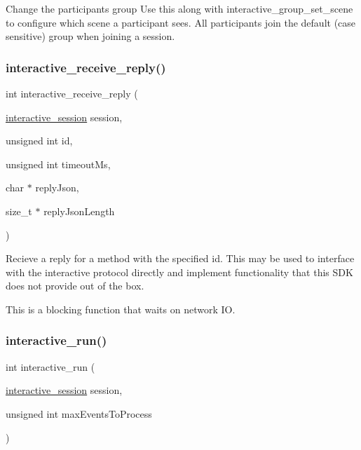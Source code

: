 Change the participant\textquotesingle{}s group Use this along with {\ttfamily interactive\+\_\+group\+\_\+set\+\_\+scene} to configure which scene a participant sees. All participants join the \textquotesingle{}default\textquotesingle{} (case sensitive) group when joining a session. 

\mbox{\label{group___interactivity_ga7e441089be6e25051bcc4d4249bb1379}} 
\subsubsection{\texorpdfstring{interactive\+\_\+receive\+\_\+reply()}{interactive\_receive\_reply()}}
{\footnotesize\ttfamily int interactive\+\_\+receive\+\_\+reply (\begin{DoxyParamCaption}\item[{\mbox{\hyperlink{group___interactivity_ga6d8819d38b8dc8994a2299cf22a65a31}{interactive\+\_\+session}}}]{session,  }\item[{unsigned int}]{id,  }\item[{unsigned int}]{timeout\+Ms,  }\item[{char $\ast$}]{reply\+Json,  }\item[{size\+\_\+t $\ast$}]{reply\+Json\+Length }\end{DoxyParamCaption})}



Recieve a reply for a method with the specified id. This may be used to interface with the interactive protocol directly and implement functionality that this S\+DK does not provide out of the box. 

This is a blocking function that waits on network IO. \mbox{\label{group___interactivity_ga88cca1c7bc083ce5eb171d750f284342}} 
\subsubsection{\texorpdfstring{interactive\+\_\+run()}{interactive\_run()}}
{\footnotesize\ttfamily int interactive\+\_\+run (\begin{DoxyParamCaption}\item[{\mbox{\hyperlink{group___interactivity_ga6d8819d38b8dc8994a2299cf22a65a31}{interactive\+\_\+session}}}]{session,  }\item[{unsigned int}]{max\+Events\+To\+Process }\end{DoxyParamCaption})}



